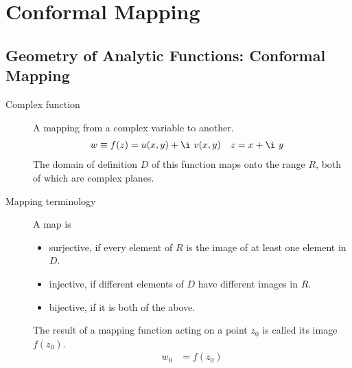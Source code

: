 \chapter{Conformal Mapping}

\section{Geometry of Analytic Functions: Conformal Mapping}

\begin{description}
    \item[Complex function] A mapping from a complex variable to another.
        \begin{align}
            w & \equiv f(z) = u(x, y) + \i\ v(x, y) &
            z & = x + \i\ y
        \end{align}
        The domain of definition $ D $ of this function maps onto the range $ R $, both
        of which are complex planes.

    \item[Mapping terminology] A map is
        \begin{itemize}
            \item surjective, if every element of $ R $ is the image of at least
                  one element in $ D $.
            \item injective, if different elements of $ D $ have different images
                  in $ R $.
            \item bijective, if it is both of the above.
        \end{itemize}

        The result of a mapping function acting on a point $ z_0 $ is called its image
        $ f(z_0) $.
        \begin{align}
            w_0 & = f(z_0)
        \end{align}


\end{description}

